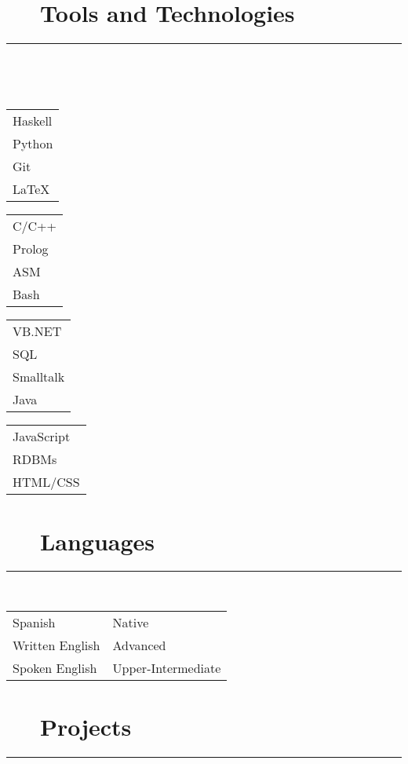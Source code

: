 \documentclass{article}
\begin{document}
\section*{\faCogs ~~ Tools and Technologies} 
\hrule
\

\
    
\begin{multicols}{4}
    \begin{tabular}{l}
    	Haskell \\
        Python \\
        Git \\
        LaTeX
    \end{tabular}

    \begin{tabular}{l}
		C/C++ \\
        Prolog \\
        ASM \\
        Bash 
    \end{tabular}
    
    \begin{tabular}{l}
        VB.NET \\
		SQL \\
	    Smalltalk \\
        Java
    \end{tabular}
    
    \begin{tabular}{l}
        JavaScript \\
        RDBMs \\
        HTML/CSS 
    \end{tabular}
   
\end{multicols}

\newpage

\section*{\faLanguage ~~ Languages}
\hrule

\
\newline
\

\begin{tabular}{l | l}
    Spanish & Native \\
    Written English & Advanced \\
    Spoken English & Upper-Intermediate
\end{tabular}

\section*{\faFileCodeO ~~ Projects}
\hrule
\
\end{document}
